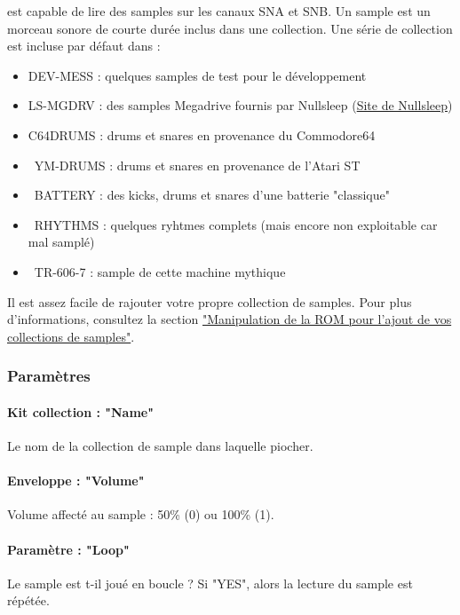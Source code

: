 \FAT est capable de lire des samples sur les canaux SNA et SNB.
Un sample est un morceau sonore de courte durée inclus dans une collection.
Une série de collection est incluse par défaut dans \FAT :\medskip

\begin{itemize}
    \item {DEV-MESS : quelques samples de test pour le développement}
    \item {LS-MGDRV : des samples Megadrive fournis par Nullsleep (\href{http://little-scale.blogspot.fr/2008/08/sega-mega-drive-sample-pack.html}{Site de Nullsleep})}
    \item {C64DRUMS : drums et snares en provenance du Commodore64}
    \item {YM-DRUMS : drums et snares en provenance de l'Atari ST}
    \item {BATTERY : des kicks, drums et snares d'une batterie "classique"}
    \item {RHYTHMS : quelques ryhtmes complets (mais encore non exploitable car mal samplé)}
    \item {TR-606-7 : sample de cette machine mythique}
\end{itemize} \medskip

Il est assez facile de rajouter votre propre collection de samples. Pour plus d'informations, consultez la section \hyperref[sec:addsamples]{"Manipulation de la ROM pour l'ajout de vos collections de samples"}.


\subsubsection{Paramètres}

\paragraph{Kit collection : "Name"} Le nom de la collection de sample dans laquelle piocher.

\paragraph{Enveloppe : "Volume"} Volume affecté au sample : 50\% (0) ou 100\% (1).

\paragraph{Paramètre : "Loop"} Le sample est t-il joué en boucle ?
                                Si "YES", alors la lecture du sample est répétée.


